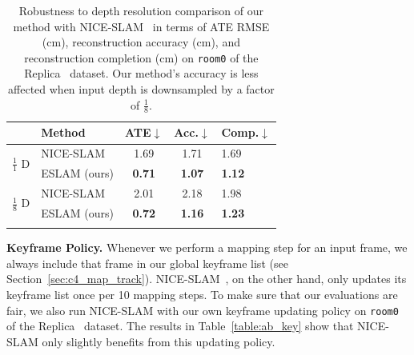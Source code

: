\begin{table}[t]
    \begin{center}
        \begin{tabular}{l|l|ccl}
            \Xhline{2\arrayrulewidth}
            & Method & ATE$\downarrow$ & Acc.$\downarrow$ & Comp.$\downarrow$ \\
            
            \hline
            \multirow{2}{*}{$\frac{1}{1}$ D}
            & NICE-SLAM & 1.69 & 1.71 & 1.69 \\
            & ESLAM (ours) & \textbf{0.71} & \textbf{1.07} & \textbf{1.12} \\

            \hline
            \multirow{2}{*}{$\frac{1}{8}$ D} & NICE-SLAM & 2.01 & 2.18 & 1.98 \\
            & ESLAM (ours) & \textbf{0.72} & \textbf{1.16} & \textbf{1.23} \\
            
            \Xhline{2\arrayrulewidth}
        \end{tabular}
    \end{center}
    \caption{Robustness to depth resolution comparison of our method with NICE-SLAM~\citep{zhu2022nice} in terms of ATE RMSE (cm), reconstruction accuracy (cm), and reconstruction completion (cm) on \texttt{room0} of the Replica~\citep{replica19arxiv} dataset. Our method's accuracy is less affected when input depth is downsampled by a factor of $\frac{1}{8}$.}
    \label{table:ab_depth}
\end{table}

\vspace{1ex}
\noindent\textbf{Keyframe Policy.} Whenever we perform a mapping step for an input frame, we always include that frame in our global keyframe list (see Section~\ref{sec:c4_map_track}). NICE-SLAM~\citep{zhu2022nice}, on the other hand, only updates its keyframe list once per 10 mapping steps. To make sure that our evaluations are fair, we also run NICE-SLAM with our own keyframe updating policy on \texttt{room0} of the Replica~\citep{replica19arxiv} dataset. The results in Table~\ref{table:ab_key} show that NICE-SLAM only slightly benefits from this updating policy.

